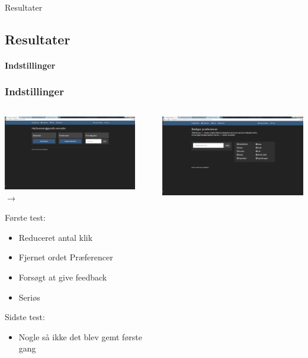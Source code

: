 \begin{frame}{Resultater}
\subsection{Resultater}
\framesubtitle{Indstillinger}
	\subsubsection{Indstillinger}
	
	\begin{minipage}[0.3\textheight]{\textwidth}
	\begin{columns}[T]
	\begin{column}{0.5\textwidth}
	 \includegraphics[width=0.9\textwidth,height=0.9\textheight,keepaspectratio, trim={1cm 0 0 16mm}, clip]{images/Screenshots/SettingsOld.png} \vspace{2 mm} $\rightarrow$ 
	 
	 Første test:
	 \begin{itemize}
	 	\item Reduceret antal klik
	 	\item Fjernet ordet Præferencer
	 	\item Forsøgt at give feedback
	 	\item Seriøs
	 \end{itemize}
	 Sidste test:
	 \begin{itemize}
	 	\item Nogle så ikke det blev gemt første gang
	 \end{itemize}
	 
	\end{column}
	\begin{column}{0.5\textwidth}
	 \includegraphics[width=1\textwidth,height=1\textheight,keepaspectratio, trim={1cm 0 0 16mm}, clip]{images/Screenshots/SettingsOld2.png}
	 

\end{column}
\end{columns}
\end{minipage}
\end{frame}
